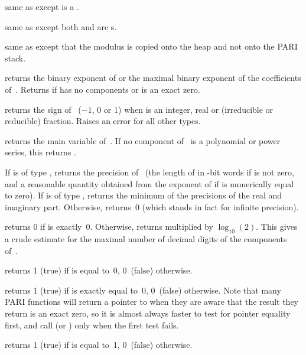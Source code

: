  same as  except  is a
.

 same as  except both 
and  are s.

 same as  except that the
modulus  is copied onto the heap and not onto the PARI stack.

 returns the binary exponent of  or the maximal
binary exponent of the coefficients of~. Returns
\hbox{} if  has no components or is an exact zero.

 returns the sign of~ ($-1$, 0 or 1) when
 is an integer, real or (irreducible or reducible) fraction. Raises
an error for all other types.

 returns the main variable of~. If no component
of~ is a polynomial or power series, this returns .

 If  is of type , returns the
precision of~ (the length of  in \B-bit words if  is
not zero, and a reasonable quantity obtained from the exponent of 
if  is numerically equal to zero). If  is of type ,
returns the minimum of the precisions of the real and imaginary part.
Otherwise, returns~0 (which stands in fact for infinite precision).

 returns 0 if  is exactly~0. Otherwise,
returns  multiplied by $\log_{10}(2)$. This gives a
crude estimate for the maximal number of decimal digits of the components
of~.


 returns 1 (true) if  is equal to~0, 0~(false)
otherwise.

 returns 1 (true) if  is exactly equal
to~0, 0~(false) otherwise. Note that many PARI functions will return a
pointer to  when they are aware that the result they return is
an exact zero, so it is almost always faster to test for pointer equality
first, and call  (or ) only when the first
test fails.

 returns 1 (true) if  is equal to~1, 0~(false)
otherwise.

